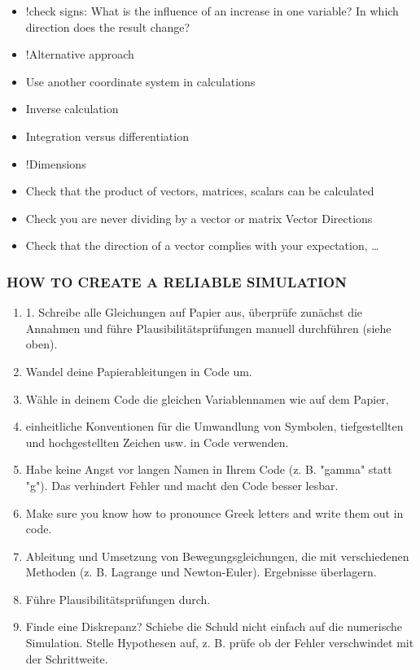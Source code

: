 \begin{itemize}
    \item !check signs: What is the influence of an increase in one variable? In which direction 
does the result change?
    \item !Alternative approach
    \item Use another coordinate system in calculations
    \item Inverse calculation 
        \item Integration versus differentiation
    \item !Dimensions
    \item Check that the product of vectors, matrices, scalars can be calculated
    \item Check you are never dividing by a vector or matrix
Vector Directions
    \item Check that the direction of a vector complies with your expectation, … 
\end{itemize}

\subsubsection{HOW TO CREATE A RELIABLE SIMULATION}
\begin{enumerate}

    \item 1. Schreibe alle Gleichungen auf Papier aus, überprüfe zunächst die Annahmen und führe Plausibilitätsprüfungen 
manuell durchführen (siehe oben). 
    \item Wandel deine Papierableitungen in Code um. 
    \item Wähle in deinem Code die gleichen Variablennamen wie auf dem Papier,
    \item 
    einheitliche Konventionen für die Umwandlung von Symbolen, tiefgestellten und hochgestellten Zeichen usw. in Code verwenden. 
    \item Habe keine Angst vor langen Namen in Ihrem Code (z. B. "gamma" statt "g"). Das verhindert Fehler und macht den Code besser lesbar. 
    \item Make sure you know how to pronounce Greek letters and write them out in code. 
    \item Ableitung und Umsetzung von Bewegungsgleichungen, die mit verschiedenen Methoden (z. B. Lagrange 
und Newton-Euler). Ergebnisse überlagern. 
    \item Führe Plausibilitätsprüfungen durch. 
    \item Finde eine Diskrepanz? Schiebe die Schuld nicht einfach auf die numerische Simulation. Stelle Hypothesen auf, z. B. prüfe ob der Fehler verschwindet mit der Schrittweite.
\end{enumerate}



